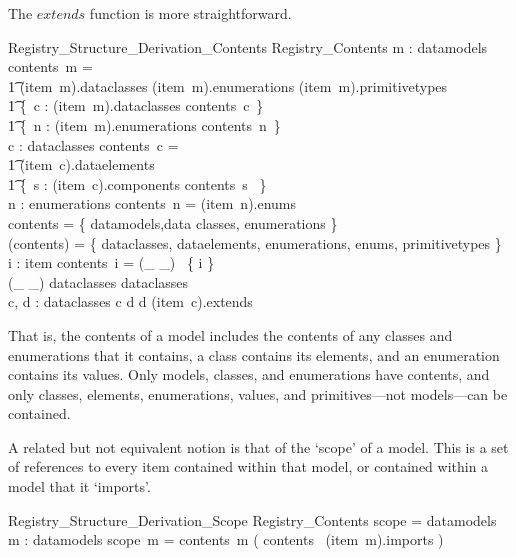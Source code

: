 \documentclass{llncs}
\def\extends{\mathrel{extends}}
\def\contains{\mathrel{contains}}
\begin{document}
The $extends$ function is more straightforward. 

\begin{schema}{Registry\_Structure\_Derivation\_Contents}
  Registry\_Contents
  \where
  \forall m : datamodels \spot contents~m = {} \\
  \t1 (item~m).dataclasses \cup (item~m).enumerations \cup
  (item~m).primitivetypes \cup {} \\
  \t1 \bigcup \{~c : (item~m).dataclasses \spot contents~c~\} \cup {} \\
  \t1 \bigcup \{~n : (item~m).enumerations \spot contents~n~\}
  \\
  \forall c : dataclasses \spot contents~c = {} \\
  \t1 (item~c).dataelements  \cup {} \\
  \t1 \bigcup \{~s : (item~c).components \spot contents~s ~\}
  \\
  \forall n : enumerations \spot contents~n = (item~n).enums
  \\
  \dom contents = \bigcup \{ datamodels,data classes, enumerations \} 
  \\
  \bigcup (\ran contents) = \bigcup \{ dataclasses, dataelements, enumerations, enums,
  primitivetypes \} 
  \\
  \forall i : \dom item \spot contents~i = (\_ \contains \_) ~\limg \{ i \}
  \rimg \\
  (\_ \extends \_) \in dataclasses \rel dataclasses \\
  \forall c, d : dataclasses \spot c \extends d \iff 
  d \in (item~c).extends
\end{schema}

That is, the contents of a model includes the contents of any classes and enumerations that it contains, a class contains its elements, and an enumeration contains its values.  Only models, classes, and enumerations have contents, and only classes, elements, enumerations, values, and primitives---not models---can be contained. 

A related but not equivalent notion is that of the `scope' of a model. This is a set of references to every item contained within that model, or contained within a model that it `imports'. 

\begin{schema}{Registry\_Structure\_Derivation\_Scope}
  Registry\_Contents
  \where
  \dom scope = datamodels 
  \\
  \forall m : datamodels \spot scope~m = contents~m \cup \bigcup 
  ( contents~ \limg (item~m).imports \rimg )
\end{schema}
\end{document}

